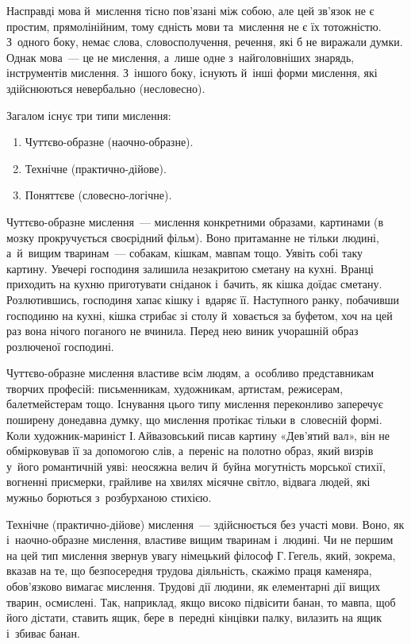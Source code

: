 \documentclass[a5paper,oneside,DIV=12,12pt,headings=small]{scrartcl}
\begin{document}
		Насправді мова й~мислення тісно пов'\-я\-за\-ні між собою, але цей зв'я\-зок не є простим, прямолінійним, тому єдність мови та~мислення не є їх тотожністю. З~одного боку, немає слова, словосполучення, речення, які б не виражали думки. Однак мова~— це не мислення, а~лише одне з~найголовніших знарядь, інструментів мислення. З~іншого боку, існують й~інші форми мислення, які здійснюються невербально (несловесно).

		Загалом існує три типи мислення:
		\begin{enumerate}
			\item Чуттєво-образне (наочно-образне).
			\item Технічне (практично-дійове).
			\item Поняттєве (словесно-логічне).
		\end{enumerate}

		Чуттєво-образне мислення~— мислення конкретними образами, картинами (в мозку прокручується своєрідний фільм). Воно притаманне не тільки людині, а~й~вищим тваринам~— собакам, кішкам, мавпам тощо. Уявіть собі таку картину. Увечері господиня залишила незакритою сметану на кухні. Вранці приходить на кухню приготувати сніданок і~бачить, як кішка доїдає сметану. Розлютившись, господиня хапає кішку і~вдаряє її. Наступного ранку, побачивши господиню на кухні, кішка стрибає зі столу й~ховається за буфетом, хоч на цей раз вона нічого поганого не вчинила. Перед нею виник учорашній образ розлюченої господині.

		Чуттєво-образне мислення властиве всім людям, а~особливо представникам творчих професій: письменникам, художникам, артистам, режисерам, балетмейстерам тощо. Існування цього типу мислення переконливо заперечує поширену донедавна думку, що мислення протікає тільки в~словесній формі. Коли художник-мариніст І.\,Айвазовський писав картину «Дев'\-я\-тий вал», він не обмірковував її за допомогою слів, а~переніс на полотно образ, який визрів у~його романтичній уяві: неосяжна велич й~буйна могутність морської стихії, вогненні присмерки, грайливе на хвилях місячне світло, відвага людей, які мужньо борються з~розбурханою стихією.

		Технічне (практично-дійове) мислення~— здійснюється без участі мови. Воно, як і~наочно-образне мислення, властиве вищим тваринам і~людині. Чи не першим на цей тип мислення звернув увагу німецький філософ Г.\,Гегель, який, зокрема, вказав на те, що безпосередня трудова діяльність, скажімо праця каменяра, обо\-в'яз\-ко\-во вимагає мислення. Трудові дії людини, як елементарні дії вищих тварин, осмислені. Так, наприклад, якщо високо підвісити банан, то мавпа, щоб його дістати, ставить ящик, бере в~передні кінцівки палку, вилазить на ящик і~збиває банан.
\end{document}
